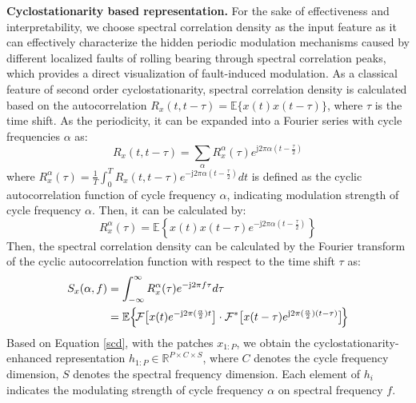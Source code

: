 \documentclass{article}
\begin{document}
	\textbf{Cyclostationarity based representation.} For the sake of effectiveness and interpretability, we choose spectral correlation density as the input feature as it can effectively characterize the hidden periodic modulation mechanisms caused by different localized faults of rolling bearing through spectral correlation peaks, which provides a direct visualization of fault-induced modulation. As a classical feature of second order cyclostationarity, spectral correlation density is calculated based on the autocorrelation $R_{x}(t,t-\tau)=\mathbb{E}\{x(t)x(t-\tau)\}$, where $\tau$ is the time shift. As the periodicity, it can be expanded into a Fourier series with cycle frequencies $\alpha$ as:
	\begin{equation}
		R_{x}(t,t-\tau)=\sum_{\alpha}R_{x}^{\alpha}(\tau)e^{\mathrm{j}2\pi\alpha\left(t-\frac{\tau}{2}\right)}
	\end{equation}
	where $R_{x}^{\alpha}(\tau)=\frac{1}{T}\int_{0}^{T}R_{x}(t,t-\tau)e^{-\mathrm{j}2\pi\alpha\left(t-\frac{\tau}{2}\right)}dt$ is defined as the cyclic autocorrelation function of cycle frequency $\alpha$, indicating modulation strength of cycle frequency $\alpha$. Then, it can be calculated by:
	\begin{equation}
		R_{x}^{\alpha}(\tau)=\mathbb{E}\left\{x(t)x(t-\tau)e^{-\mathrm{j}2\pi\alpha\left(t-\frac{\tau}{2}\right)}\right\}
	\end{equation}
	Then, the spectral correlation density can be calculated by the Fourier transform of the cyclic autocorrelation function with respect to the time shift $\tau$ as:
	\begin{equation}
		\begin{split}
			S_{x}(\alpha,f) &= \int_{-\infty}^{\infty} R_{x}^{\alpha}(\tau) e^{-\mathrm{j}2\pi f\tau} d\tau \\
			&= \mathbb{E}\Bigl\{ \!\mathcal{F}\bigl[ x(t)e^{-\mathrm{j}2\pi(\frac{\alpha}{2})t} \bigr]
			\cdot
			\mathcal{F}^{*}\bigl[ x(t-\tau)e^{\mathrm{j}2\pi(\frac{\alpha}{2})(t-\tau)} \bigr] \!\Bigr\}
			\label{scd}
		\end{split}
	\end{equation}
	Based on Equation \ref{scd}, with the patches $x_{1:P}$, we obtain the cyclostationarity-enhanced representation $h_{1:P}\in\mathbb{R}^{P\times C\times S}$, where $C$ denotes the cycle frequency dimension, $S$ denotes the spectral frequency dimension. Each element of $h_{i}$ indicates the modulating strength of cycle frequency $\alpha$ on spectral frequency $f$.
	
\end{document}
